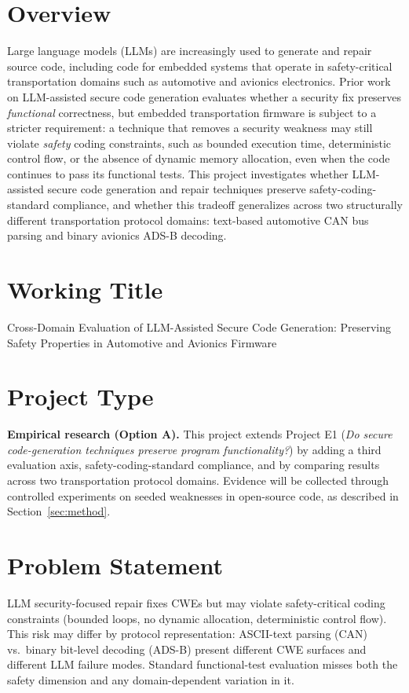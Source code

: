\documentclass[12pt]{article}
\begin{document}
\section{Overview}
Large language models (LLMs) are increasingly used to generate and repair source code, including code for embedded systems that operate in safety-critical transportation domains such as automotive and avionics electronics. Prior work on LLM-assisted secure code generation evaluates whether a security fix preserves \emph{functional} correctness, but embedded transportation firmware is subject to a stricter requirement: a technique that removes a security weakness may still violate \emph{safety} coding constraints, such as bounded execution time, deterministic control flow, or the absence of dynamic memory allocation, even when the code continues to pass its functional tests. This project investigates whether LLM-assisted secure code generation and repair techniques preserve safety-coding-standard compliance, and whether this tradeoff generalizes across two structurally different transportation protocol domains: text-based automotive CAN bus parsing and binary avionics ADS-B decoding.

\section{Working Title}
Cross-Domain Evaluation of LLM-Assisted Secure Code Generation: Preserving Safety Properties in Automotive and Avionics Firmware

\section{Project Type}
\textbf{Empirical research (Option A).} This project extends Project E1 (\emph{Do secure code-generation techniques preserve program functionality?}) by adding a third evaluation axis, safety-coding-standard compliance, and by comparing results across two transportation protocol domains. Evidence will be collected through controlled experiments on seeded weaknesses in open-source code, as described in Section~\ref{sec:method}.

\section{Problem Statement}
LLM security-focused repair fixes CWEs but may violate safety-critical coding constraints (bounded loops, no dynamic allocation, deterministic control flow). This risk may differ by protocol representation: ASCII-text parsing (CAN) vs.\ binary bit-level decoding (ADS-B) present different CWE surfaces and different LLM failure modes. Standard functional-test evaluation misses both the safety dimension and any domain-dependent variation in it.
\end{document}
